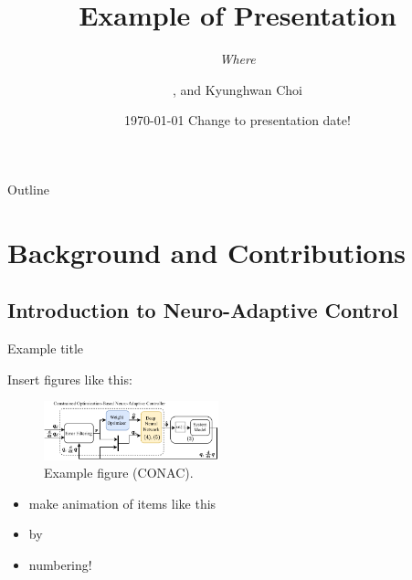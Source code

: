 \documentclass[8pt, aspectratio=169]{beamer} %
\title{
    Example of Presentation
}
\subtitle{
    \textit{Where}\\
}
\author{
  \textbf{\cblue{Myeongseok Ryu}}\inst{1},  %
  and 
  Kyunghwan Choi\inst{1}
}
\date{{\today} Change to presentation date!}
\institute{%
    \begin{minipage}[c]{\linewidth}
      \centering
      \inst{1}%
      Mobility Intelligence and Control Laboratory (MIC Lab) \\
      CCS Graduate School of Mobility \\
      Korea Advanced Institute of Science and Technology (KAIST)
  \end{minipage}
}
\begin{document}
\titlepage 

\begin{frame}{Outline}
  \tableofcontents
\end{frame}

\section{Background and Contributions}

\subsection{Introduction to Neuro-Adaptive Control}

\begin{frame}{\insertsubsectionhead}{Example title}


  \vspace{0.5cm}

  {
    Insert figures like this:
    \begin{figure}
      \includegraphics[width=0.45\textwidth]{figures/Controller.drawio.pdf}
      \caption{Example figure (CONAC).}
    \end{figure}
  }

  {
    \begin{itemize}
      \item<3-> make animation of items like this
      \item<4-> by
      \item<5-> numbering!
    \end{itemize}
  }

\end{frame}

\end{document}

